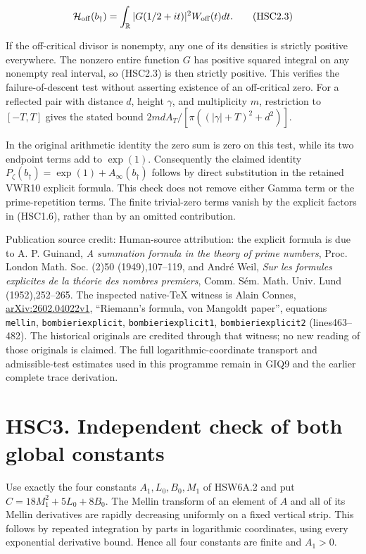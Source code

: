 \[
 \mathcal H_{\rm off}(b_\dagger)
 =\int_{\mathbb R}|G(1/2+it)|^2W_{\rm off}(t)dt.
\tag{HSC2.3}
\]

If the off-critical divisor is nonempty, any one of its densities is
strictly positive everywhere. The nonzero entire function \(G\) has
positive squared integral on any nonempty real interval, so (HSC2.3) is
then strictly positive. This verifies the failure-of-descent test
without asserting existence of an off-critical zero. For a reflected
pair with distance \(d\), height \(\gamma\), and multiplicity \(m\),
restriction to \([-T,T]\) gives the stated bound
\(2md A_T/[\pi((|\gamma|+T)^2+d^2)]\).

In the original arithmetic identity the zero sum is zero on this test,
while its two endpoint terms add to \(\exp(1)\). Consequently the
claimed identity \(P_\zeta(b_\dagger)=\exp(1)+A_\infty(b_\dagger)\)
follows by direct substitution in the retained VWR10 explicit formula.
This check does not remove either Gamma term or the prime-repetition
terms. The finite trivial-zero terms vanish by the explicit factors in
(HSC1.6), rather than by an omitted contribution.

Publication source credit: Human-source attribution: the explicit
formula is due to A. P. Guinand, \emph{A summation formula in the theory
of prime numbers}, Proc. London Math. Soc. (2)50 (1949),107--119, and
André Weil, \emph{Sur les formules explicites de la théorie des nombres
premiers}, Comm. Sém. Math. Univ. Lund (1952),252--265. The inspected
native-TeX witness is Alain Connes,
\href{https://arxiv.org/abs/2602.04022v1}{arXiv:2602.04022v1},
``Riemann's formula, von Mangoldt paper'', equations \texttt{mellin},
\texttt{bombieriexplicit}, \texttt{bombieriexplicit1},
\texttt{bombieriexplicit2} (lines463--482). The historical originals are
credited through that witness; no new reading of those originals is
claimed. The full logarithmic-coordinate transport and admissible-test
estimates used in this programme remain in GIQ9 and the earlier complete
trace derivation.

\section{HSC3. Independent check of both global
constants}\label{hsc3.-independent-check-of-both-global-constants}

Use exactly the four constants \(A_1,L_0,B_0,M_1\) of HSW6A.2 and put
\(C=18M_1^2+5L_0+8B_0\). The Mellin transform of an element of \(A\) and
all of its Mellin derivatives are rapidly decreasing uniformly on a
fixed vertical strip. This follows by repeated integration by parts in
logarithmic coordinates, using every exponential derivative bound. Hence
all four constants are finite and \(A_1>0\).

